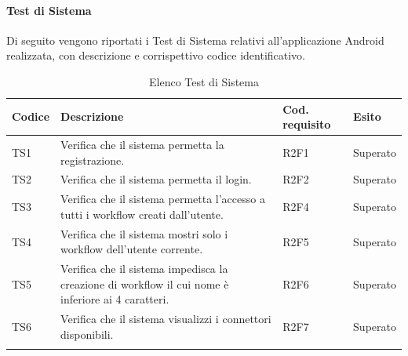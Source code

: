 \paragraph{Test di Sistema}
\label{sec:tsRQ}
Di seguito vengono riportati i Test di Sistema relativi all'applicazione Android realizzata, con descrizione e corrispettivo codice identificativo.
\begin{center}
	\centering
	\renewcommand{\arraystretch}{1.5}
	\begin{longtable}{  p{1.2cm}  p{8.5cm} p{2cm} p{1.5cm} }
		\rowcolor{tableHeadYellow}
		\textbf{Codice}   & \textbf{Descrizione} & \textbf{Cod. \mbox{requisito}} & \textbf{Esito} \\ 
		\endhead
		TS1 & Verifica che il sistema permetta la registrazione. & R2F1 & Superato \\
		TS2 & Verifica che il sistema permetta il login. & R2F2 & Superato \\
		TS3 & Verifica che il sistema permetta l’accesso a tutti i workflow creati dall’utente. & R2F4 & Superato \\
		TS4 & Verifica che il sistema mostri solo i workflow dell’utente corrente. & R2F5 & Superato \\
		TS5 & Verifica che il sistema impedisca la creazione di workflow il cui nome è inferiore ai 4 caratteri. & R2F6 & Superato \\
		TS6 & Verifica che il sistema visualizzi i connettori disponibili. & R2F7 & Superato \\
		\rowcolor{white}
		\caption{Elenco Test di Sistema}
	\end{longtable}
\end{center}
\pagebreak
